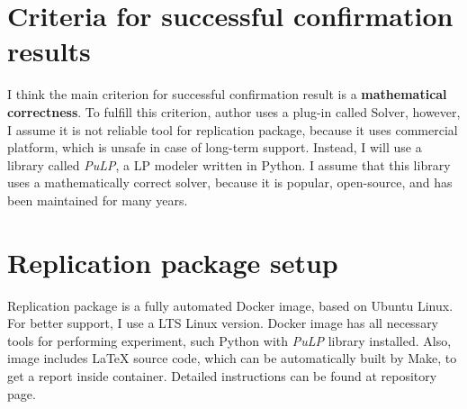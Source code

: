 \documentclass[sigconf, nonacm]{acmart}
\begin{document}
\section{Criteria for successful confirmation results}

I think the main criterion for successful confirmation result is a \textbf{mathematical correctness}. To fulfill this criterion, author uses a plug-in called Solver, however, I assume it is not reliable tool for replication package, because it uses commercial platform, which is unsafe in case of long-term support. Instead, I will use a library called \textit{PuLP}, a LP modeler written in Python. I assume that this library uses a mathematically correct solver, because it is popular, open-source, and has been maintained for many years.

\section{Replication package setup}
Replication package is a fully automated Docker image, based on Ubuntu Linux. For better support, I use a LTS Linux version. Docker image has all necessary tools for performing experiment, such Python with \textit{PuLP} library installed. Also, image includes LaTeX source code, which can be automatically built by Make, to get a report inside container. Detailed instructions can be found at repository page.
\end{document}
